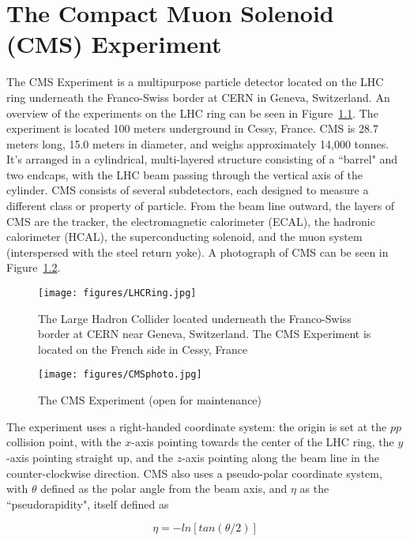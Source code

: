 \chapter{The Compact Muon Solenoid (CMS) Experiment}

The CMS Experiment is a multipurpose particle detector located on the LHC ring underneath the Franco-Swiss border at CERN in Geneva, Switzerland. An overview of the experiments on the LHC ring can be seen in Figure~\ref{fig:LHCRing}. The experiment is located 100 meters underground in Cessy, France. CMS is 28.7 meters long, 15.0 meters in diameter, and weighs approximately 14,000 tonnes. It's arranged in a cylindrical, multi-layered structure consisting of a ``barrel" and two endcaps, with the LHC beam passing through the vertical axis of the cylinder. CMS consists of several subdetectors, each designed to measure a different class or property of particle. From the beam line outward, the layers of CMS are the tracker, the electromagnetic calorimeter (ECAL), the hadronic calorimeter (HCAL), the superconducting solenoid, and the muon system (interspersed with the steel return yoke). A photograph of CMS can be seen in Figure~\ref{fig:CMSphoto}.

\begin{figure}\centering
  \texttt{[image: figures/LHCRing.jpg]}
  \caption{\label{fig:LHCRing} The Large Hadron Collider located underneath the Franco-Swiss border at CERN near Geneva, Switzerland. The CMS Experiment is located on the French side in Cessy, France}
\end{figure}

\begin{figure}\centering
  \texttt{[image: figures/CMSphoto.jpg]}
  \caption{\label{fig:CMSphoto} The CMS Experiment (open for maintenance)}
\end{figure}


The experiment uses a right-handed coordinate system: the origin is set at the $pp$ collision point, with the $x$-axis pointing towards the center of the LHC ring, the $y$-axis pointing straight up, and the $z$-axis pointing along the beam line in the counter-clockwise direction. CMS also uses a pseudo-polar coordinate system, with $\theta$ defined as the polar angle from the beam axis, and $\eta$ as the ``pseudorapidity", itself defined as 


\begin{equation}
 \eta = -ln\left[tan\left(\theta/2\right)\right]
 \end{equation}

